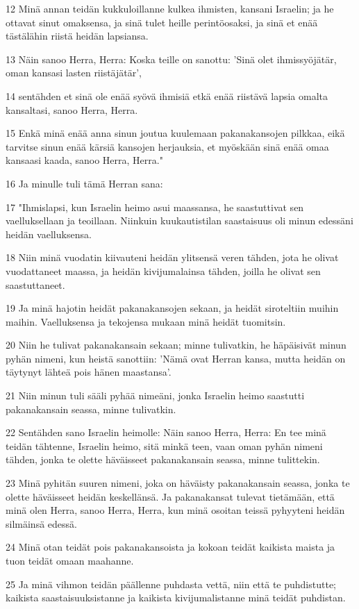 \par 12 Minä annan teidän kukkuloillanne kulkea ihmisten, kansani Israelin; ja he ottavat sinut omaksensa, ja sinä tulet heille perintöosaksi, ja sinä et enää tästälähin riistä heidän lapsiansa.
\par 13 Näin sanoo Herra, Herra: Koska teille on sanottu: 'Sinä olet ihmissyöjätär, oman kansasi lasten riistäjätär',
\par 14 sentähden et sinä ole enää syövä ihmisiä etkä enää riistävä lapsia omalta kansaltasi, sanoo Herra, Herra.
\par 15 Enkä minä enää anna sinun joutua kuulemaan pakanakansojen pilkkaa, eikä tarvitse sinun enää kärsiä kansojen herjauksia, et myöskään sinä enää omaa kansaasi kaada, sanoo Herra, Herra."
\par 16 Ja minulle tuli tämä Herran sana:
\par 17 "Ihmislapsi, kun Israelin heimo asui maassansa, he saastuttivat sen vaelluksellaan ja teoillaan. Niinkuin kuukautistilan saastaisuus oli minun edessäni heidän vaelluksensa.
\par 18 Niin minä vuodatin kiivauteni heidän ylitsensä veren tähden, jota he olivat vuodattaneet maassa, ja heidän kivijumalainsa tähden, joilla he olivat sen saastuttaneet.
\par 19 Ja minä hajotin heidät pakanakansojen sekaan, ja heidät siroteltiin muihin maihin. Vaelluksensa ja tekojensa mukaan minä heidät tuomitsin.
\par 20 Niin he tulivat pakanakansain sekaan; minne tulivatkin, he häpäisivät minun pyhän nimeni, kun heistä sanottiin: 'Nämä ovat Herran kansa, mutta heidän on täytynyt lähteä pois hänen maastansa'.
\par 21 Niin minun tuli sääli pyhää nimeäni, jonka Israelin heimo saastutti pakanakansain seassa, minne tulivatkin.
\par 22 Sentähden sano Israelin heimolle: Näin sanoo Herra, Herra: En tee minä teidän tähtenne, Israelin heimo, sitä minkä teen, vaan oman pyhän nimeni tähden, jonka te olette häväisseet pakanakansain seassa, minne tulittekin.
\par 23 Minä pyhitän suuren nimeni, joka on häväisty pakanakansain seassa, jonka te olette häväisseet heidän keskellänsä. Ja pakanakansat tulevat tietämään, että minä olen Herra, sanoo Herra, Herra, kun minä osoitan teissä pyhyyteni heidän silmäinsä edessä.
\par 24 Minä otan teidät pois pakanakansoista ja kokoan teidät kaikista maista ja tuon teidät omaan maahanne.
\par 25 Ja minä vihmon teidän päällenne puhdasta vettä, niin että te puhdistutte; kaikista saastaisuuksistanne ja kaikista kivijumalistanne minä teidät puhdistan.
